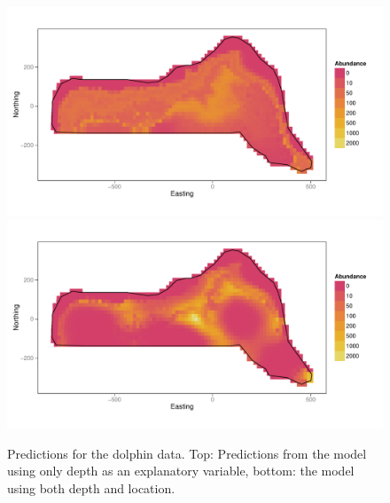 \documentclass[a4paper,12pt]{article}
\begin{document}
\begin{figure}[h!]
  \caption{Predictions for the dolphin data. Top: Predictions from the model using only depth as an explanatory variable, bottom: the model using both depth and location.}
  \label{fits-depth}
  \begin{center}
    \includegraphics[width=\textwidth]{figs/fit-depth}\\
    \includegraphics[width=\textwidth]{figs/fit-depth-xy}
  \end{center}
\end{figure}

\newpage
\end{document}
